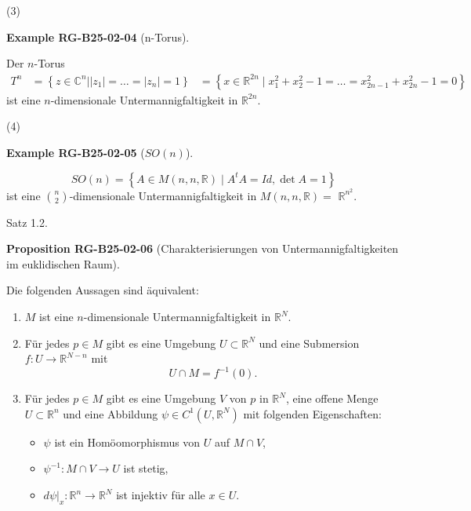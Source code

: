 \documentclass[10pt, letterpaper]{article}
\newcommand{\CustomHeading}[3]{%
  \par\medskip\noindent%
  \textbf{#1 #2} \textnormal{(#3)}.\enskip%
}
\newenvironment{PROP}[2]{\begin{unitbox}\CustomHeading{Proposition}{#1}{#2}}{\end{unitbox}}
\newenvironment{EXA}[2]{\begin{unitbox}\CustomHeading{Example}{#1}{#2}}{\end{unitbox}}
\begin{document}
(3) 



\begin{EXA}{RG-B25-02-04}{n-Torus}
Der $n$-Torus
$$
\begin{aligned}
T^{n} & =\left\{z \in \mathbb{C}^{n}| | z_{1}\left|=\ldots=\left|z_{n}\right|=1\right\}\right.
& =\left\{x \in \mathbb{R}^{2 n} \mid x_{1}^{2}+x_{2}^{2}-1=\ldots=x_{2 n-1}^{2}+x_{2 n}^{2}-1=0\right\}
\end{aligned}
$$
ist eine $n$-dimensionale Untermannigfaltigkeit in $\mathbb{R}^{2 n}$.
\end{EXA}



(4)

\begin{EXA}{RG-B25-02-05}{$SO(n)$}
$$
S O(n)=\left\{A \in M(n, n, \mathbb{R}) \mid A^{t} A=I d, \operatorname{det} A=1\right\}
$$
ist eine $\binom{n}{2}$-dimensionale Untermannigfaltigkeit in $M(n, n, \mathbb{R})=$ $\mathbb{R}^{n^{2}}$.
\end{EXA}



Satz 1.2. 

\begin{PROP}{RG-B25-02-06}{Charakterisierungen von Untermannigfaltigkeiten im euklidischen Raum}
Die folgenden Aussagen sind äquivalent:
\begin{enumerate}
    \item $M$ ist eine $n$-dimensionale Untermannigfaltigkeit in $\mathbb{R}^{N}$.
    
    \item Für jedes $p \in M$ gibt es eine Umgebung $U \subset \mathbb{R}^{N}$ und eine Submersion $f: U \rightarrow \mathbb{R}^{N-n}$ mit
    \[
    U \cap M = f^{-1}(0).
    \]

    \item Für jedes $p \in M$ gibt es eine Umgebung $V$ von $p$ in $\mathbb{R}^{N}$, eine offene Menge $U \subset \mathbb{R}^{n}$ und eine Abbildung $\psi \in C^{1}\left(U, \mathbb{R}^{N}\right)$ mit folgenden Eigenschaften:
    \begin{itemize}
        \item $\psi$ ist ein Homöomorphismus von $U$ auf $M \cap V$,
        \item $\psi^{-1}: M \cap V \rightarrow U$ ist stetig,
        \item $\left.d\psi\right|_{x}: \mathbb{R}^{n} \rightarrow \mathbb{R}^{N}$ ist injektiv für alle $x \in U$.
    \end{itemize}
\end{enumerate}
\end{PROP}
\end{document}
